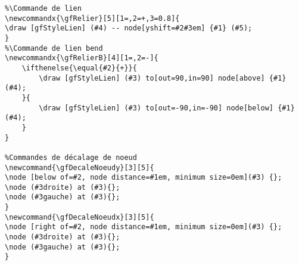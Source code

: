 \documentclass[a4paper,9pt]{article}
\begin{document}
\begin{verbatim}
%\Commande de lien
\newcommandx{\gfRelier}[5][1=,2=+,3=0.8]{
\draw [gfStyleLien] (#4) -- node[yshift=#2#3em] {#1} (#5);
}
%\Commande de lien bend
\newcommandx{\gfRelierB}[4][1=,2=-]{
    \ifthenelse{\equal{#2}{+}}{
        \draw [gfStyleLien] (#3) to[out=90,in=90] node[above] {#1} (#4);
    }{
        \draw [gfStyleLien] (#3) to[out=-90,in=-90] node[below] {#1} (#4);
    }
}

%Commandes de décalage de noeud
\newcommand{\gfDecaleNoeudy}[3][5]{
\node [below of=#2, node distance=#1em, minimum size=0em](#3) {};
\node (#3droite) at (#3){};
\node (#3gauche) at (#3){};
}
\newcommand{\gfDecaleNoeudx}[3][5]{
\node [right of=#2, node distance=#1em, minimum size=0em](#3) {};
\node (#3droite) at (#3){};
\node (#3gauche) at (#3){};
}
\end{verbatim}



\end{document}
